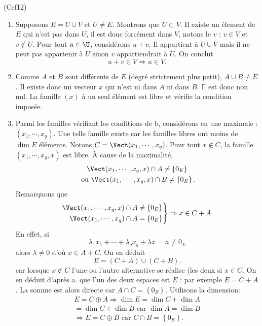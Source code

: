 \begin{tiny}(Cef12)\end{tiny}
\begin{enumerate}
 \item Supposons $E = U \cup V$ et $U \neq E$. Montrons que $U \subset V$.\newline
 Il existe un élement de $E$ qui n'est pas dans $U$, il est donc forcément dans $V$, notons le $v$ : $v\in V$ et $v\notin U$.\newline
 Pour tout $u\in \U$, considérons $u+v$. Il appartient à $U \cup V$ mais il ne peut pas appartenir à $U$ sinon $v$ appartiendrait à $U$. On conclut
\[
 u + v \in V \Rightarrow u \in V.
\]

 \item Comme $A$ et $B$ sont différents de $E$ (degré strictement plus petit), $A \cup B \neq E$. Il existe donc un vecteur $x$ qui n'est ni dans $A$ ni dans $B$. Il est donc non nul. La famille $(x)$ à un seul élément est libre et vérifie la condition imposée.
 
 \item Parmi les familles vérifiant les conditions de b, considérons en une maximale : $(x_1,\cdots,x_q)$. Une telle famille existe car les familles libres ont moins de $\dim E$ éléments. Notons $C = \Vect(x_1,\cdots,x_q)$.\newline
 Pour tout $x\notin C$, la famille $(x_1,\cdots,x_q,x)$ est libre. \`A cause de la maximalité,
 \begin{multline*}
\Vect(x_1,\cdots,x_q,x) \cap A \neq \left\lbrace 0_E \right\rbrace  \\
\text{ ou }
  \Vect(x_1,\cdots,x_q,x) \cap B \neq \left\lbrace 0_E \right\rbrace.  
 \end{multline*}
Remarquons que
\[
\left. 
\begin{aligned}
 \Vect(x_1,\cdots,x_q,x) \cap A &\neq \left\lbrace 0_E \right\rbrace\\ \Vect(x_1,\cdots,x_q) \cap A &= \left\lbrace 0_E \right\rbrace
\end{aligned}
\right\rbrace 
\Rightarrow
x \in C + A.
\]
En effet, si 
\[ 
\lambda_1 x_1 + \cdots + \lambda_q x_q + \lambda x = a\neq 0_E
\]
alors $\lambda \neq 0$ d'où $x \in A + C$.
On en déduit
\[
 E = (C+A) \cup (C+B).
\]
car lorsque $x\notin C$ l'une ou l'autre alternative se réalise (les deux si $x\in C$.\newline
On en déduit d'après a. que l'un des deux espaces est $E$ : par exemple $E = C + A$. La somme est alors directe car $A\cap C = \left\lbrace 0_E\right\rbrace$. Utilisons la dimension:
\begin{multline*}
 E = C \oplus A \Rightarrow \dim E = \dim C + \dim A \\
 = \dim C + \dim B \text{ car } \dim A = \dim B \\
 \Rightarrow E = C \oplus B \text{ car } C \cap B = \left\lbrace 0_E\right\rbrace.
\end{multline*}


\end{enumerate}
